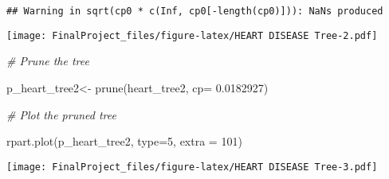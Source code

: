\documentclass[
]{article}
\newenvironment{Shaded}{\begin{snugshade}}{\end{snugshade}}
\newcommand{\AttributeTok}[1]{\textcolor[rgb]{0.77,0.63,0.00}{#1}}
\newcommand{\CommentTok}[1]{\textcolor[rgb]{0.56,0.35,0.01}{\textit{#1}}}
\newcommand{\DecValTok}[1]{\textcolor[rgb]{0.00,0.00,0.81}{#1}}
\newcommand{\FloatTok}[1]{\textcolor[rgb]{0.00,0.00,0.81}{#1}}
\newcommand{\FunctionTok}[1]{\textcolor[rgb]{0.00,0.00,0.00}{#1}}
\newcommand{\NormalTok}[1]{#1}
\newcommand{\OtherTok}[1]{\textcolor[rgb]{0.56,0.35,0.01}{#1}}
\newcommand{\SpecialCharTok}[1]{\textcolor[rgb]{0.00,0.00,0.00}{#1}}
\newcommand{\StringTok}[1]{\textcolor[rgb]{0.31,0.60,0.02}{#1}}
\begin{document}
\begin{verbatim}
## Warning in sqrt(cp0 * c(Inf, cp0[-length(cp0)])): NaNs produced
\end{verbatim}

\texttt{[image: FinalProject\_files/figure-latex/HEART DISEASE Tree-2.pdf]}

\begin{Shaded}
\begin{Highlighting}[]
\CommentTok{\# Prune the tree}

\NormalTok{p\_heart\_tree2}\OtherTok{\textless{}{-}} \FunctionTok{prune}\NormalTok{(heart\_tree2, }\AttributeTok{cp=} \FloatTok{0.0182927}\NormalTok{)}


\CommentTok{\# Plot the pruned tree}

\FunctionTok{rpart.plot}\NormalTok{(p\_heart\_tree2,}
           \AttributeTok{type=}\DecValTok{5}\NormalTok{,}
           \AttributeTok{extra =} \DecValTok{101}\NormalTok{)}
\end{Highlighting}
\end{Shaded}

\texttt{[image: FinalProject\_files/figure-latex/HEART DISEASE Tree-3.pdf]}

\begin{Shaded}
\end{Shaded}
\end{document}
